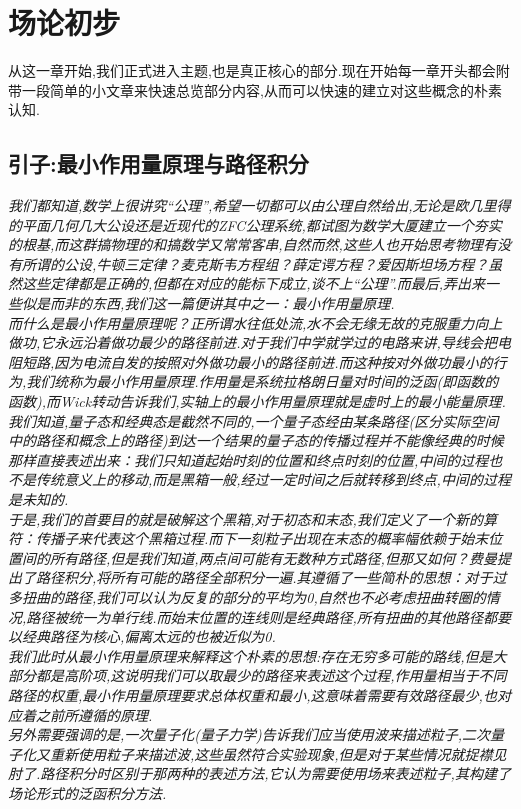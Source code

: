 \setchapterpreamble[u]{\margintoc}
\chapter{场论初步}


从这一章开始,我们正式进入主题,也是真正核心的部分.现在开始每一章开头都会附带一段简单的小文章来快速总览部分内容,从而可以快速的建立对这些概念的朴素认知.
\section*{引子:最小作用量原理与路径积分}
\textit{我们都知道,数学上很讲究“公理”,希望一切都可以由公理自然给出,无论是欧几里得的平面几何几大公设还是近现代的ZFC公理系统,都试图为数学大厦建立一个夯实的根基,而这群搞物理的和搞数学又常常客串,自然而然,这些人也开始思考物理有没有所谓的公设,牛顿三定律？麦克斯韦方程组？薛定谔方程？爱因斯坦场方程？虽然这些定律都是正确的,但都在对应的能标下成立,谈不上“公理”.而最后,弄出来一些似是而非的东西,我们这一篇便讲其中之一：最小作用量原理.\\
    而什么是最小作用量原理呢？正所谓水往低处流,水不会无缘无故的克服重力向上做功,它永远沿着做功最少的路径前进.对于我们中学就学过的电路来讲,导线会把电阻短路,因为电流自发的按照对外做功最小的路径前进.而这种按对外做功最小的行为,我们统称为最小作用量原理.作用量是系统拉格朗日量对时间的泛函(即函数的函数),而Wick转动告诉我们,实轴上的最小作用量原理就是虚时上的最小能量原理.\\
    我们知道,量子态和经典态是截然不同的,一个量子态经由某条路径(区分实际空间中的路径和概念上的路径)到达一个结果的量子态的传播过程并不能像经典的时候那样直接表述出来：我们只知道起始时刻的位置和终点时刻的位置,中间的过程也不是传统意义上的移动,而是黑箱一般,经过一定时间之后就转移到终点,中间的过程是未知的.\\
    于是,我们的首要目的就是破解这个黑箱,对于初态和末态,我们定义了一个新的算符：传播子来代表这个黑箱过程.而下一刻粒子出现在末态的概率幅依赖于始末位置间的所有路径,但是我们知道,两点间可能有无数种方式路径,但那又如何？费曼提出了路径积分,将所有可能的路径全部积分一遍.其遵循了一些简朴的思想：对于过多扭曲的路径,我们可以认为反复的部分的平均为0,自然也不必考虑扭曲转圈的情况,路径被统一为单行线.而始末位置的连线则是经典路径,所有扭曲的其他路径都要以经典路径为核心,偏离太远的也被近似为0.\\
    我们此时从最小作用量原理来解释这个朴素的思想:存在无穷多可能的路线,但是大部分都是高阶项,这说明我们可以取最少的路径来表述这个过程,作用量相当于不同路径的权重,最小作用量原理要求总体权重和最小,这意味着需要有效路径最少,也对应着之前所遵循的原理.\\
    另外需要强调的是,一次量子化(量子力学)告诉我们应当使用波来描述粒子,二次量子化又重新使用粒子来描述波,这些虽然符合实验现象,但是对于某些情况就捉襟见肘了.路径积分时区别于那两种的表述方法,它认为需要使用场来表述粒子,其构建了场论形式的泛函积分方法.}
